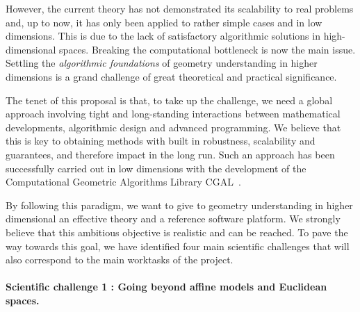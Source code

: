 

However, the current theory has not demonstrated its scalability to real problems and, up to now, it has only been applied to rather simple cases and in low dimensions. This is  due to the lack of satisfactory algorithmic solutions in high-dimensional spaces.
Breaking the computational bottleneck is now the main issue.  Settling the {\em algorithmic foundations} of geometry understanding in
higher dimensions
is a grand challenge of great theoretical and practical significance. 


The tenet of this proposal is that, to take up the challenge, we need a global approach involving
tight and long-standing interactions between mathematical developments, algorithmic design and advanced programming. We believe that this is key to obtaining methods with built in
robustness, scalability and guarantees, and therefore  impact in the long run.
Such an approach has been successfully carried out in low dimensions with the 
development of the Computational Geometric Algorithms Library CGAL~\cite{cgal}. 

By following this paradigm, we want  to give to  geometry understanding in higher dimensional an effective theory and a reference software platform. 
We strongly believe that this ambitious objective is realistic and can be reached. To pave the way towards this goal, we have identified  four main scientific challenges that will also correspond to the main worktasks of the project.



\paragraph{Scientific challenge 1 :  Going beyond affine models and Euclidean spaces.}

